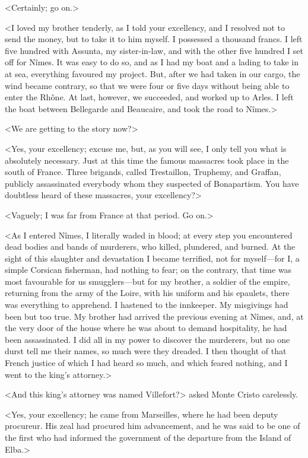  <Certainly; go on.> 

 <I loved my brother tenderly, as I told your excellency, and I resolved not to send the money, but to take it to him myself. I possessed a thousand francs. I left five hundred with Assunta, my sister-in-law, and with the other five hundred I set off for Nîmes. It was easy to do so, and as I had my boat and a lading to take in at sea, everything favoured my project. But, after we had taken in our cargo, the wind became contrary, so that we were four or five days without being able to enter the Rhône. At last, however, we succeeded, and worked up to Arles. I left the boat between Bellegarde and Beaucaire, and took the road to Nîmes.> 

 <We are getting to the story now?> 

 <Yes, your excellency; excuse me, but, as you will see, I only tell you what is absolutely necessary. Just at this time the famous massacres took place in the south of France. Three brigands, called Trestaillon, Truphemy, and Graffan, publicly assassinated everybody whom they suspected of Bonapartism. You have doubtless heard of these massacres, your excellency?> 

 <Vaguely; I was far from France at that period. Go on.> 

 <As I entered Nîmes, I literally waded in blood; at every step you encountered dead bodies and bands of murderers, who killed, plundered, and burned. At the sight of this slaughter and devastation I became terrified, not for myself—for I, a simple Corsican fisherman, had nothing to fear; on the contrary, that time was most favourable for us smugglers—but for my brother, a soldier of the empire, returning from the army of the Loire, with his uniform and his epaulets, there was everything to apprehend. I hastened to the innkeeper. My misgivings had been but too true. My brother had arrived the previous evening at Nîmes, and, at the very door of the house where he was about to demand hospitality, he had been assassinated. I did all in my power to discover the murderers, but no one durst tell me their names, so much were they dreaded. I then thought of that French justice of which I had heard so much, and which feared nothing, and I went to the king's attorney.> 

 <And this king's attorney was named Villefort?> asked Monte Cristo carelessly. 

 <Yes, your excellency; he came from Marseilles, where he had been deputy procureur. His zeal had procured him advancement, and he was said to be one of the first who had informed the government of the departure from the Island of Elba.> 

